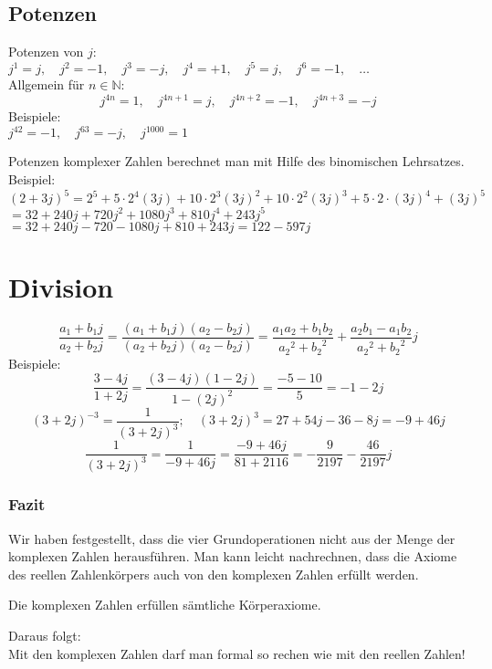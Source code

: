 \subsection{Potenzen}
Potenzen von $j$: \\
$j^1 = j, \quad j^2 = -1, \quad j^3 = -j, \quad j^4 = +1, \quad j^5 = j, \quad j^6 = -1, \quad \dots$\\
Allgemein für $n \in \mathbb{N}$: 
\[ \boxed{j^{4n} = 1, \quad j^{4n+1} = j, \quad j^{4n+2} = -1, \quad j^{4n+3} = -j} \]
Beispiele: \\
$j^{42} = -1, \quad j^{63} = -j, \quad j^{1000} = 1$

Potenzen komplexer Zahlen berechnet man mit Hilfe des binomischen Lehrsatzes. \\
Beispiel: \\
$(2 + 3 j)^5 = 2^5 + 5 \cdot 2^4 (3 j) + 10 \cdot 2^3 (3 j)^2 + 10 \cdot 2^2 (3 j)^3 + 5 \cdot 2 \cdot (3 j)^4 + (3 j)^5$\\
$ = 32 + 240 j + 720 j^2 + 1080 j^3 + 810 j^4 + 243 j^5$\\
$= 32 + 240 j - 720 - 1080 j + 810 + 243 j = 122 - 597 j$

\section{Division}
\[ \boxed{\frac{a_1 + b_1 j}{a_2 + b_2 j} = \frac{(a_1 + b_1 j)(a_2 - b_2 j)}{(a_2 + b_2 j)(a_2 - b_2 j)} = \frac{a_1 a_2 + b_1 b_2}{{a_2}^2 + {b_2}^2} + \frac{a_2 b_1 - a_1 b_2}{{a_2}^2 + {b_2}^2} j} \]
Beispiele: \\
\[ \frac{3 - 4 j}{1 + 2 j} = \frac{(3 - 4 j)(1 - 2 j)}{1 - (2 j)^2} = \frac{-5 -10}{5} = -1 -2 j \]
\[ (3 + 2 j)^{-3} = \frac{1}{(3 + 2 j)^3}; \quad (3 + 2 j)^3 = 27 + 54 j - 36 - 8 j = -9 + 46 j \]
\[ \frac{1}{(3 + 2 j)^3} = \frac{1}{-9 + 46 j} = \frac{-9 + 46 j}{81 + 2116} = -\frac{9}{2197} - \frac{46}{2197} j \]

\subsubsection{Fazit}
Wir haben festgestellt, dass die vier Grundoperationen nicht aus der Menge der komplexen Zahlen herausführen. Man kann leicht nachrechnen, dass die Axiome des reellen Zahlenkörpers auch von den komplexen Zahlen erfüllt werden. 
\begin{framed}\noindent
  Die komplexen Zahlen erfüllen sämtliche Körperaxiome. 
\end{framed}
Daraus folgt: \\
Mit den komplexen Zahlen darf man formal so rechen wie mit den reellen Zahlen! 

